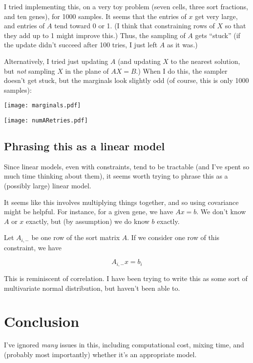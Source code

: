 \documentclass{article}
\begin{document}
I tried implementing this, on a very toy problem (seven cells, three sort fractions,
and ten genes), for 1000 samples. It seems that the entries of $x$ get very large,
and entries of $A$ tend toward 0 or 1.
(I think that constraining rows of $X$ so that they add up to 1 might improve this.)
Thus, the sampling of $A$ gets ``stuck'' (if the update didn't
succeed after 100 tries, I just left $A$ as it was.)

Alternatively, I tried just updating $A$ (and updating $X$ to the nearest
solution, but {\em not} sampling $X$ in the plane of $AX=B$.)
When I do this, the sampler doesn't get stuck, but the marginals look 
slightly odd (of course, this is only 1000 samples):

\texttt{[image: marginals.pdf]}

\texttt{[image: numARetries.pdf]}

\subsection{Phrasing this as a linear model}

Since linear models, even with constraints, tend to be tractable (and I've spent so
much time thinking about them), it seems worth trying to phrase
this as a (possibly large) linear model.

It seems like this involves multiplying things together, and so using covariance might
be helpful. For instance, for a given gene, we have $Ax = b$. We don't know $A$ or $x$
exactly, but (by assumption) we do know $b$ exactly. 

Let $A_{i,-}$ be one row of the sort matrix $A$.
If we consider one row of this constraint, we have

\[
A_{i,-}x = b_i
\]

This is reminiscent of correlation. I have been trying to write this as some sort
of multivariate normal distribution, but haven't been able to.

\section{Conclusion}

I've ignored {\em many} issues in this, including computational cost,
mixing time, and (probably most importantly) whether it's an appropriate model.



\end{document}
